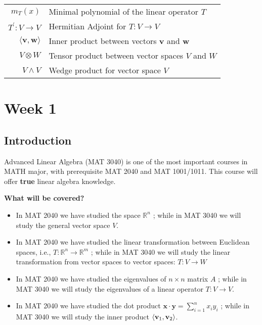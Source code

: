 \documentclass[11pt]{article}
\begin{document}
\begin{tabular}{rl}
 \({m}_{T}\left( x\right) \) & Minimal polynomial of the linear operator \(T\)\\

 \({T}^{\prime } : V \rightarrow  V\) & Hermitian Adjoint for \(T : V \rightarrow  V\)\\

 \(\langle \mathbf{v},\mathbf{w}\rangle \) & Inner product between vectors \(\mathbf{v}\) and \(\mathbf{w}\)\\

 \(V \otimes  W\) & Tensor product between vector spaces \(V\) and \(W\)\\

 \(V \land  V\) & Wedge product for vector space \(V\)
\end{tabular}


\newpage

\section{Week 1}

\subsection{Introduction}

Advanced Linear Algebra (MAT 3040) is one of the most important courses in MATH major, with prerequisite MAT 2040 and MAT 1001/1011. This course will offer {\bf true} linear algebra knowledge. 

\medskip

{\bf What will be covered?}
\begin{itemize}
\item In MAT 2040 we have studied the space \({\mathbb{R}}^n\) ; while in MAT 3040 we will study the general vector space \(V\).

\item In MAT 2040 we have studied the linear transformation between Euclidean spaces, i.e., \(T : {\mathbb{R}}^n \rightarrow  {\mathbb{R}}^{m}\) ; while in MAT 3040 we will study the linear transformation from vector spaces to vector spaces: \(T : V \rightarrow  W\)

\item In MAT 2040 we have studied the eigenvalues of \(n \times  n\) matrix \(A\) ; while in MAT 3040 we will study the eigenvalues of a linear operator \(T : V \rightarrow  V\).

\item In MAT 2040 we have studied the dot product \(\mathbf{x} \cdot  \mathbf{y} = \mathop{\sum }\limits_{{i = 1}}^n{x}_{i}{y}_{i}\) ; while in MAT 3040 we will study the inner product \(\left\langle  {{\bf v}_1,{\bf v}_2}\right\rangle\).
\end{itemize}
\end{document}
